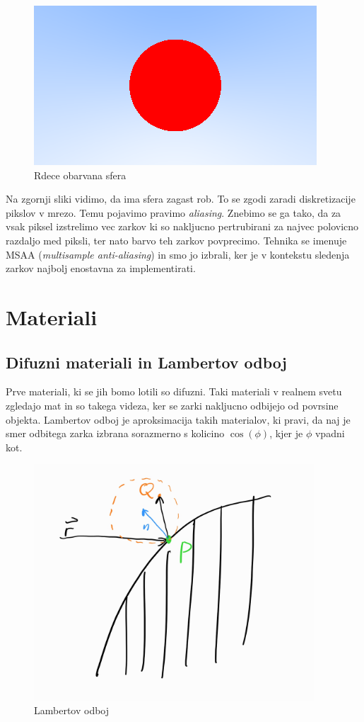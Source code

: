 \documentclass[12pt, a4paper]{article}
\begin{document}
\begin{figure}[H]
	\label{fig:red_sphere}
	\includegraphics[width=\textwidth]{red_sphere}
	\caption{Rdece obarvana sfera}
\end{figure}

Na zgornji sliki vidimo, da ima sfera zagast rob. To se zgodi zaradi diskretizacije pikslov v mrezo. Temu
pojavimo pravimo \textit{aliasing}. Znebimo se ga tako, da za vsak piksel izstrelimo vec zarkov ki so nakljucno
pertrubirani za najvec polovicno razdaljo med piksli, ter nato barvo teh zarkov povprecimo. Tehnika se imenuje
MSAA (\textit{multisample anti-aliasing}) in smo jo izbrali, ker je v kontekstu sledenja zarkov najbolj
enostavna za implementirati.

\section{Materiali}

\subsection{Difuzni materiali in Lambertov odboj}

Prve materiali, ki se jih bomo lotili so difuzni. Taki materiali v realnem svetu zgledajo mat in so takega
videza, ker se zarki nakljucno odbijejo od povrsine objekta. Lambertov odboj je aproksimacija takih materialov,
ki pravi, da naj je smer odbitega zarka izbrana sorazmerno s kolicino $\cos (\phi) $, kjer je $\phi$ vpadni
kot.

\begin{figure}[H]
	\centering
	\includegraphics[height=250pt]{shema_difzuni}
	\caption{Lambertov odboj}
\end{figure}
\end{document}
